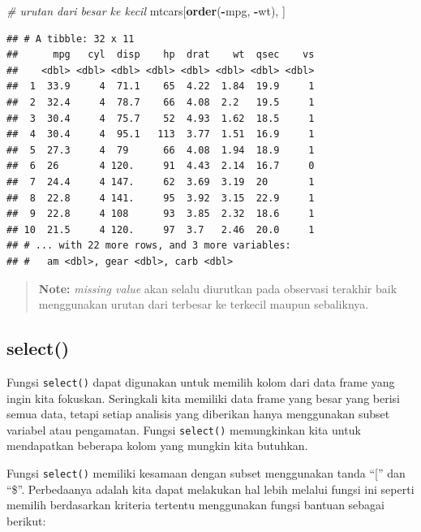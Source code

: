\documentclass[]{book}
\newenvironment{Shaded}{\begin{snugshade}}{\end{snugshade}}
\newcommand{\KeywordTok}[1]{\textcolor[rgb]{0.13,0.29,0.53}{\textbf{#1}}}
\newcommand{\CommentTok}[1]{\textcolor[rgb]{0.56,0.35,0.01}{\textit{#1}}}
\newcommand{\OperatorTok}[1]{\textcolor[rgb]{0.81,0.36,0.00}{\textbf{#1}}}
\newcommand{\NormalTok}[1]{#1}
\begin{document}
\begin{Shaded}
\begin{Highlighting}[]
\CommentTok{# urutan dari besar ke kecil}
\NormalTok{mtcars[}\KeywordTok{order}\NormalTok{(}\OperatorTok{-}\NormalTok{mpg, }\OperatorTok{-}\NormalTok{wt), ]}
\end{Highlighting}
\end{Shaded}

\begin{verbatim}
## # A tibble: 32 x 11
##      mpg   cyl  disp    hp  drat    wt  qsec    vs
##    <dbl> <dbl> <dbl> <dbl> <dbl> <dbl> <dbl> <dbl>
##  1  33.9     4  71.1    65  4.22  1.84  19.9     1
##  2  32.4     4  78.7    66  4.08  2.2   19.5     1
##  3  30.4     4  75.7    52  4.93  1.62  18.5     1
##  4  30.4     4  95.1   113  3.77  1.51  16.9     1
##  5  27.3     4  79      66  4.08  1.94  18.9     1
##  6  26       4 120.     91  4.43  2.14  16.7     0
##  7  24.4     4 147.     62  3.69  3.19  20       1
##  8  22.8     4 141.     95  3.92  3.15  22.9     1
##  9  22.8     4 108      93  3.85  2.32  18.6     1
## 10  21.5     4 120.     97  3.7   2.46  20.0     1
## # ... with 22 more rows, and 3 more variables:
## #   am <dbl>, gear <dbl>, carb <dbl>
\end{verbatim}

\begin{quote}
\textbf{Note: } \emph{missing value} akan selalu diurutkan pada
observasi terakhir baik menggunakan urutan dari terbesar ke terkecil
maupun sebaliknya.
\end{quote}

\subsection{select()}\label{select}

Fungsi \texttt{select()} dapat digunakan untuk memilih kolom dari data
frame yang ingin kita fokuskan. Seringkali kita memiliki data frame yang
besar yang berisi semua data, tetapi setiap analisis yang diberikan
hanya menggunakan subset variabel atau pengamatan. Fungsi
\texttt{select()} memungkinkan kita untuk mendapatkan beberapa kolom
yang mungkin kita butuhkan.

Fungsi \texttt{select()} memiliki kesamaan dengan subset menggunakan
tanda ``{[}'' dan ``\$''. Perbedaanya adalah kita dapat melakukan hal
lebih melalui fungsi ini seperti memilih berdasarkan kriteria tertentu
menggunakan fungsi bantuan sebagai berikut:
\end{document}
